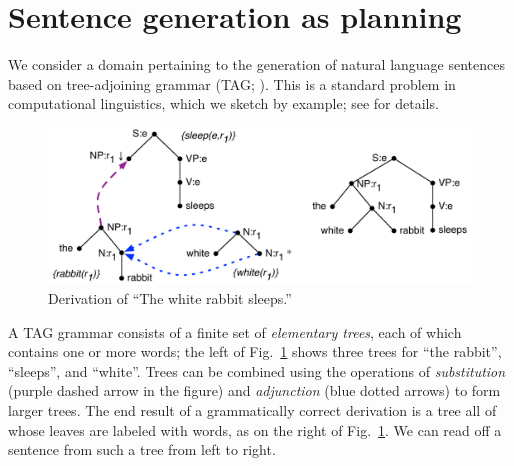 \section{Sentence generation as planning}
\label{sec:crisp}


We consider a domain pertaining to the generation of natural language
sentences based on tree-adjoining grammar (TAG;
\cite{joshi;etal1997}).  This is a standard problem in computational
linguistics, which we sketch by example; see
\cite{Stone2003a,KolSto07} for details.


\begin{figure}
  \centering
  \includegraphics[width=1\columnwidth]{pic-derivation}
\vspace{-0.6cm}
  \caption{Derivation of ``The white rabbit sleeps.''}
  \label{fig:white-rabbit-sleeps-deriv}
\vspace{-0.6cm}
\end{figure}

A TAG grammar consists of a finite set of \emph{elementary trees},
each of which contains one or more words; the left of
Fig.~\ref{fig:white-rabbit-sleeps-deriv} shows three trees for ``the
rabbit'', ``sleeps'', and ``white''.  Trees can be combined using the
operations of \emph{substitution} (purple dashed arrow in the figure)
and \emph{adjunction} (blue dotted arrows) to form larger trees.
The end result of a grammatically correct derivation is a tree all of
whose leaves are labeled with words, as on the right of
Fig.~\ref{fig:white-rabbit-sleeps-deriv}. We can read off a sentence
from such a tree from left to right.

